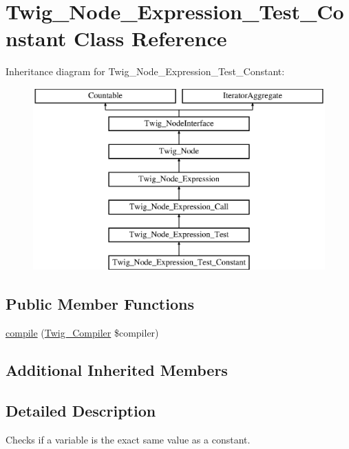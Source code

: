 \hypertarget{class_twig___node___expression___test___constant}{}\section{Twig\+\_\+\+Node\+\_\+\+Expression\+\_\+\+Test\+\_\+\+Constant Class Reference}
\label{class_twig___node___expression___test___constant}
Inheritance diagram for Twig\+\_\+\+Node\+\_\+\+Expression\+\_\+\+Test\+\_\+\+Constant\+:\begin{figure}[H]
\begin{center}
\leavevmode
\includegraphics[height=7.000000cm]{class_twig___node___expression___test___constant}
\end{center}
\end{figure}
\subsection*{Public Member Functions}
\begin{DoxyCompactItemize}
\item 
\hyperlink{class_twig___node___expression___test___constant_a4e0faa87c3fae583620b84d3607085da}{compile} (\hyperlink{class_twig___compiler}{Twig\+\_\+\+Compiler} \$compiler)
\end{DoxyCompactItemize}
\subsection*{Additional Inherited Members}


\subsection{Detailed Description}
Checks if a variable is the exact same value as a constant.


